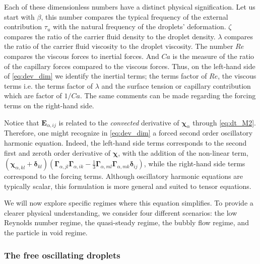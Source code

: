 Each of these dimensionless numbers have a distinct physical signification. 
Let us start with $\beta$, this number compares the typical frequency of the external contribution $\tau_u$ with the natural frequency of the droplets' deformation.
$\zeta$ compares the ratio of the carrier fluid density to the droplet density. 
$\lambda$ compares the ratio of the carrier fluid viscosity to the droplet viscosity. 
The number $Re$ compares the viscous forces to inertial forces. 
And $Ca$ is the measure of the ratio of the capillary forces compared to the viscous forces. 
Thus, on the left-hand side of \ref{eq:dev_dim} we identify the inertial terms; the terms factor of $Re$, the viscous terms i.e. the terms factor of $\lambda$ and the surface tension or capillary contribution which are factor of $1/Ca$. 
The same comments can be made regarding the forcing terms on the right-hand side. 

Notice that $\textbf{E}_{\alpha,ij}$ is related to the \textit{convected} derivative of $\bm\chi_\alpha$ through \ref{eq:dt_M2}. 
Therefore, one might recognize in \ref{eq:dev_dim} a forced second order oscillatory harmonic equation.
Indeed, the left-hand side terms corresponds to the second first and zeroth order derivative of $\bm\chi$, with the addition of the non-linear term, $ (\bm\chi_{\alpha,kl}+\bm\delta_{kl}) 
(\bm\Gamma_{\alpha,jl}\bm\Gamma_{\alpha,ik}  
- \frac{1}{3}
\bm\Gamma_{\alpha,ml}\bm\Gamma_{\alpha,mk}  
\bm\delta_{ij}
)$, while the right-hand side terms correspond to the forcing terms. Although oscillatory harmonic equations are typically scalar, this formulation is more general and suited to tensor equations. 

We will now explore specific regimes where this equation simplifies. To provide a clearer physical understanding, we consider four different scenarios: the low Reynolds number regime, the quasi-steady regime, the bubbly flow regime, and the particle in void regime. 


\subsubsection{The free oscillating droplets}

